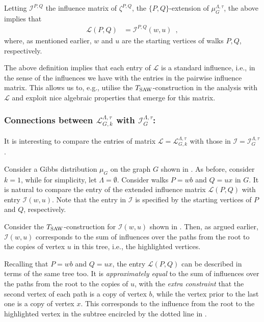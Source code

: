 \documentclass[11pt,reqno]{amsart}
\numberwithin{equation}{section}
\newcommand{\cI}{{\mathcal{I}}}
\newcommand{\cL}{{\mathcal{L}}}
\newcommand{\applegreen}[1]{ {\color{applegreen}#1}}
\newcommand{\amethyst}[1]{{\color{amethyst}#1} }
\newcommand{\blue}[1]{{\color{blue}#1}}
\newcommand{\bluepigment}[1]{{\color{blue(pigment)}#1}}
\newcommand{\deeppink}[1]{{\color{deeppink}#1}}
\newcommand{\goldenbrown}[1]{{\color{goldenbrown}#1}}
\newcommand{\heliotrope}[1]{{\color{heliotrope}#1}}
\newcommand{\red}[1]{{\color{red}#1}}
\newcommand{\rosegold}[1]{{\color{rosegold}#1}}
\newcommand{\Tsaw}{T_{\rm SAW}}
\newcommand{\infmatrix}{\cI}
\renewcommand{\applegreen}[1]{#1}
\renewcommand{\amethyst}[1]{#1}
\renewcommand{\blue}[1]{#1}
\renewcommand{\bluepigment}[1]{#1}
\renewcommand{\deeppink}[1]{#1}
\renewcommand{\goldenbrown}[1]{#1}
\renewcommand{\heliotrope}[1]{#1}
\renewcommand{\red}[1]{#1}
\renewcommand{\rosegold}[1]{#1}
\newcommand{\kb}{\deeppink{b}}
\newcommand{\kk}{\bluepigment{k}}
\newcommand{\kP}{\goldenbrown{P}}
\newcommand{\kQ}{\amethyst{Q}}
\newcommand{\ku}{\red{u}}
\newcommand{\kw}{\blue{w}}
\newcommand{\kx}{\heliotrope{x}}
\renewcommand{\kb}{b}
\renewcommand{\kk}{k}
\renewcommand{\kP}{P}
\renewcommand{\kQ}{Q}
\renewcommand{\ku}{u}
\renewcommand{\kw}{w}
\renewcommand{\kx}{x}
\newcommand{\ExtdInfMatrix}{\rosegold{\cL}}
\newcommand{\ExtdInfMatrixF}{\applegreen{\cL}^{\Lambda,\tau}_{G,\kk}}
\begin{document}
Letting $\infmatrix^{\kP,\kQ}$ the influence matrix of $\zeta^{\kP,\kQ}$, the $\{\kP,\kQ\}$-extension of $\mu^{\Lambda,\tau}_G$, 
 the above implies that
\begin{align}
\ExtdInfMatrix(\kP,\kQ) &=\infmatrix^{\kP,\kQ}(\kw,\ku)\enspace,
\end{align}
where, as mentioned earlier,  $\kw$ and $\ku$ are the starting  vertices of walks $\kP,\kQ$, respectively.



The above definition implies that each entry of $\ExtdInfMatrix$   is a standard influence, i.e.,  in 
the sense of the influences we have with the entries in the pairwise influence matrix. This allows us to, e.g., utilise the $\Tsaw$-construction in   the analysis with 
$\ExtdInfMatrix$ and exploit  nice algebraic properties that emerge for this  matrix.

 
\subsubsection*{Connections between $\ExtdInfMatrixF$ with $\infmatrix^{\Lambda,\tau}_{G}$:}
It is  interesting to compare the entries of matrix $\ExtdInfMatrix=\ExtdInfMatrixF$ with those in $\infmatrix=\infmatrix^{\Lambda,\tau}_{G}$.

Consider a Gibbs distribution $\mu_G$ on the graph $G$ shown in . As before, consider 
$\kk=1$, while for simplicity, let $\Lambda=\emptyset$.  Consider walks $\kP=\kw\kb$ and $\kQ=\ku\kx$ in $G$.
It is natural to compare the entry of the extended influence matrix $\ExtdInfMatrix(\kP,\kQ)$ with   entry  
$\infmatrix(\kw,\ku)$. Note that the entry in $\infmatrix$ is specified by the starting vertices of $\kP$ and $\kQ$, respectively. 

Consider the $\Tsaw$-construction for $\infmatrix(\kw,\ku)$ shown in .  Then,  
as argued earlier, $\infmatrix(\kw,\ku)$ corresponds to  the sum of influences  over the paths from the root to the copies 
of vertex $\ku$ in this tree, i.e., the highlighted vertices.

Recalling that $\kP=\kw\kb$ and $\kQ=\ku\kx$,  the entry $\ExtdInfMatrix(\kP,\kQ)$ can be described in terms 
of the same tree too. It is  {\em approximately equal} to the sum of  influences  over the paths from the 
root to the copies of $\ku$,  with the {\em extra  constraint} that  the second vertex of each path
is a copy of vertex $\kb$, while the vertex prior  to the last one is a copy of vertex $\kx$. 
%
This corresponds to  the influence from the root to the highlighted  vertex in the subtree encircled by the dotted line in . 
\end{document}
